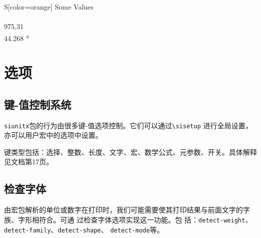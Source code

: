 \documentclass{article}
\begin{document}
\begin{table}[H]
\caption{Detection of surrounding material in an \texttt{S}
column.}
\label{tab:S:extras}
\centering
\begin{tabular}{S[color=orange]}
\toprule
{Some Values} \\
 \\
\color{purple} 975,31 \\
44.268 \textsuperscript{\emph{a}} \\
\bottomrule
\end{tabular}
\end{table}

\section{选项}

\subsection{键-值控制系统}

\texttt{siunitx}包的行为由很多键-值选项控制。它们可以通过\verb!\sisetup!
进行全局设置，亦可以用户宏中的选项中设置。

键类型包括：选择、整数、长度、文字、宏、数学公式、元参数、开关。具体解释
见文档第17页。

\subsection{检查字体}

由宏包解析的单位或数字在打印时，我们可能需要使其打印结果与前面文字的字族、字形相符合。可通
过检查字体选项实现这一功能。包
括：\verb!detect-weight!、\verb!detect-family!、\verb!detect-shape!、
\verb!detect-mode!等。

%
\end{document}
